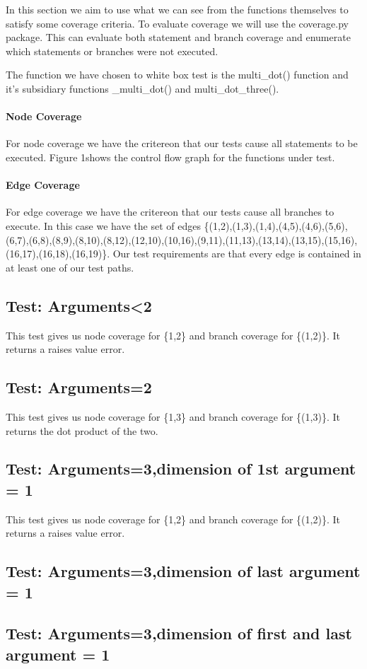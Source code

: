 In this section we aim to use what we can see from the functions themselves to satisfy some coverage
criteria. To evaluate coverage we will use the coverage.py package. This can evaluate both statement and branch coverage and enumerate which statements or branches were not executed.

The function we have chosen to white box test is the multi\_dot() function and it's subsidiary functions \_multi\_dot() and multi\_dot\_three().

\paragraph{Node Coverage}


For node coverage we have the critereon that our tests cause all statements to be executed. Figure 1shows the control flow graph for the functions under test. 



\paragraph{Edge Coverage}

For edge coverage we have the critereon that our tests cause all branches to execute. In this case we have the set of edges \{(1,2),(1,3),(1,4),(4,5),(4,6),(5,6),(6,7),(6,8),(8,9),(8,10),(8,12),(12,10),(10,16),(9,11),(11,13),(13,14),(13,15),(15,16),(16,17),(16,18),(16,19)\}.
Our test requirements are that every edge is contained in at least one of our test paths.

\subsection{Test: Arguments<2}
This test gives us node coverage for \{1,2\} and branch coverage for \{(1,2)\}. It returns a raises value error.

\subsection{Test: Arguments=2}

This test gives us node coverage for \{1,3\} and branch coverage for \{(1,3)\}. It returns the dot product of the two.


\subsection{Test: Arguments=3,dimension of 1st argument = 1}

This test gives us node coverage for \{1,2\} and branch coverage for \{(1,2)\}. It returns a raises value error.



\subsection{Test: Arguments=3,dimension of last argument = 1}


\subsection{Test: Arguments=3,dimension of first and last argument = 1}
